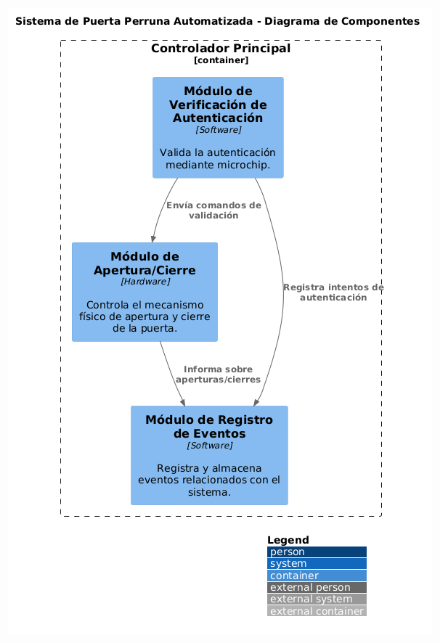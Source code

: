 \begin{figure}[!h] 
\centering
\includegraphics[scale=0.5]{Pictures/capt-asw/codePP.png}\caption{}
\end{figure}



